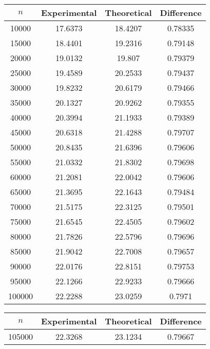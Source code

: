 \begin{table}
    \centering
    \begin{minipage}{0.48\textwidth}
        \centering
        \begin{tabular}{|c|c|c|c|}
            \hline 
            $n$ & Experimental & Theoretical & Difference \\ 
            \hline 
            10000 & 17.6373 & 18.4207 & 0.78335 \\ 
            15000 & 18.4401 & 19.2316 & 0.79148 \\ 
            20000 & 19.0132 & 19.807 & 0.79379 \\ 
            25000 & 19.4589 & 20.2533 & 0.79437 \\ 
            30000 & 19.8232 & 20.6179 & 0.79466 \\ 
            35000 & 20.1327 & 20.9262 & 0.79355 \\ 
            40000 & 20.3994 & 21.1933 & 0.79389 \\ 
            45000 & 20.6318 & 21.4288 & 0.79707 \\ 
            50000 & 20.8435 & 21.6396 & 0.79606 \\ 
            55000 & 21.0332 & 21.8302 & 0.79698 \\ 
            60000 & 21.2081 & 22.0042 & 0.79606 \\ 
            65000 & 21.3695 & 22.1643 & 0.79484 \\ 
            70000 & 21.5175 & 22.3125 & 0.79501 \\ 
            75000 & 21.6545 & 22.4505 & 0.79602 \\ 
            80000 & 21.7826 & 22.5796 & 0.79696 \\ 
            85000 & 21.9042 & 22.7008 & 0.79657 \\ 
            90000 & 22.0176 & 22.8151 & 0.79753 \\ 
            95000 & 22.1266 & 22.9233 & 0.79666 \\ 
            100000 & 22.2288 & 23.0259 & 0.7971 \\ 
            \hline 
        \end{tabular}
    \end{minipage}
    \hfill
    \begin{minipage}{0.48\textwidth}
        \centering
        \begin{tabular}{|c|c|c|c|}
            \hline 
            $n$ & Experimental & Theoretical & Difference \\ 
            \hline 
            105000 & 22.3268 & 23.1234 & 0.79667 \\ 

\end{tabular}
\end{minipage}
\end{table}
